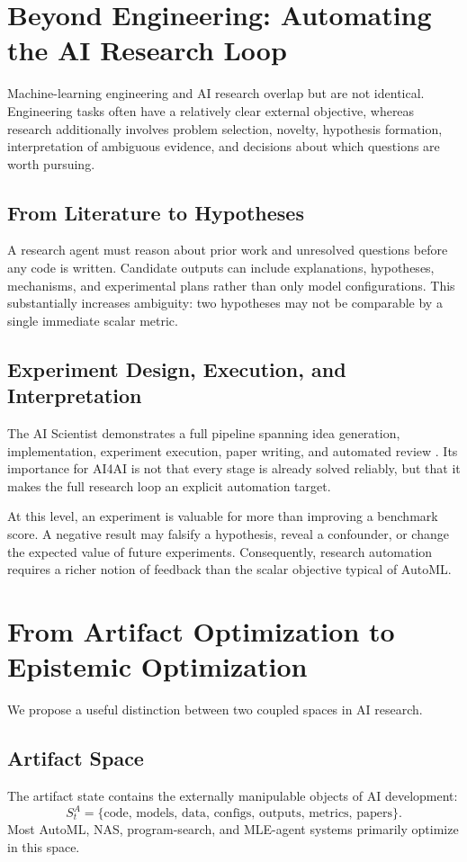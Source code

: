 \documentclass[journal]{IEEEtran}
\begin{document}
\section{Beyond Engineering: Automating the AI Research Loop}
\label{sec:researchagents}

Machine-learning engineering and AI research overlap but are not identical. Engineering tasks often have a relatively clear external objective, whereas research additionally involves problem selection, novelty, hypothesis formation, interpretation of ambiguous evidence, and decisions about which questions are worth pursuing.

\subsection{From Literature to Hypotheses}
A research agent must reason about prior work and unresolved questions before any code is written. Candidate outputs can include explanations, hypotheses, mechanisms, and experimental plans rather than only model configurations. This substantially increases ambiguity: two hypotheses may not be comparable by a single immediate scalar metric.

\subsection{Experiment Design, Execution, and Interpretation}
The AI Scientist demonstrates a full pipeline spanning idea generation, implementation, experiment execution, paper writing, and automated review \cite{lu2024aiscientist}. Its importance for AI4AI is not that every stage is already solved reliably, but that it makes the full research loop an explicit automation target.

At this level, an experiment is valuable for more than improving a benchmark score. A negative result may falsify a hypothesis, reveal a confounder, or change the expected value of future experiments. Consequently, research automation requires a richer notion of feedback than the scalar objective typical of AutoML.

\section{From Artifact Optimization to Epistemic Optimization}
\label{sec:epistemic}

We propose a useful distinction between two coupled spaces in AI research.

\subsection{Artifact Space}
The artifact state contains the externally manipulable objects of AI development:
\begin{equation*}
S_t^{A}=\{\text{code, models, data, configs, outputs, metrics, papers}\}.
\end{equation*}
Most AutoML, NAS, program-search, and MLE-agent systems primarily optimize in this space.
\end{document}
